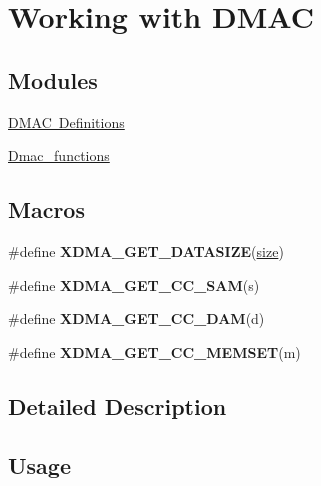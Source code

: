 \hypertarget{group__dmac__module}{}\section{Working with D\+M\+AC}
\label{group__dmac__module}
\subsection*{Modules}
\begin{DoxyCompactItemize}
\item 
\mbox{\hyperlink{group__dmac__defines}{D\+M\+A\+C Definitions}}
\item 
\mbox{\hyperlink{group__dmac__functions}{Dmac\+\_\+functions}}
\end{DoxyCompactItemize}
\subsection*{Macros}
\begin{DoxyCompactItemize}
\item 
\#define {\bfseries X\+D\+M\+A\+\_\+\+G\+E\+T\+\_\+\+D\+A\+T\+A\+S\+I\+ZE}(\mbox{\hyperlink{sun4u_2tte_8h_a245260f6f74972558f61b85227df5aae}{size}})
\item 
\#define {\bfseries X\+D\+M\+A\+\_\+\+G\+E\+T\+\_\+\+C\+C\+\_\+\+S\+AM}(s)
\item 
\#define {\bfseries X\+D\+M\+A\+\_\+\+G\+E\+T\+\_\+\+C\+C\+\_\+\+D\+AM}(d)
\item 
\#define {\bfseries X\+D\+M\+A\+\_\+\+G\+E\+T\+\_\+\+C\+C\+\_\+\+M\+E\+M\+S\+ET}(m)
\end{DoxyCompactItemize}


\subsection{Detailed Description}
\hypertarget{group__RTEMSBSPsARM_Usage}{}\subsection{Usage}\label{group__RTEMSBSPsARM_Usage}

